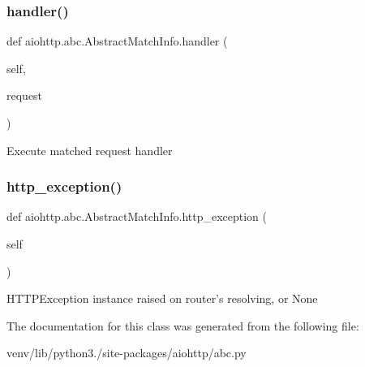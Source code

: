 \subsubsection{\texorpdfstring{handler()}{handler()}}
{\footnotesize\ttfamily def aiohttp.\+abc.\+Abstract\+Match\+Info.\+handler (\begin{DoxyParamCaption}\item[{}]{self,  }\item[{}]{request }\end{DoxyParamCaption})}

\begin{DoxyVerb}Execute matched request handler\end{DoxyVerb}
 \mbox{\label{classaiohttp_1_1abc_1_1_abstract_match_info_a9b27b04d6696d44230149af3fd67c5a1}} 
\subsubsection{\texorpdfstring{http\+\_\+exception()}{http\_exception()}}
{\footnotesize\ttfamily def aiohttp.\+abc.\+Abstract\+Match\+Info.\+http\+\_\+exception (\begin{DoxyParamCaption}\item[{}]{self }\end{DoxyParamCaption})}

\begin{DoxyVerb}HTTPException instance raised on router's resolving, or None\end{DoxyVerb}
 

The documentation for this class was generated from the following file\+:\begin{DoxyCompactItemize}
\item 
venv/lib/python3./site-\/packages/aiohttp/abc.\+py\end{DoxyCompactItemize}
